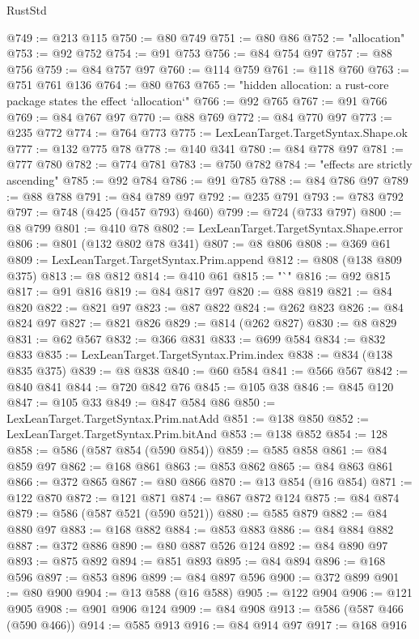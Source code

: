 \begin{lexlean}{RustStd}
\begin{coremodule}
{\begin{coremodule}
{{{{{{{{{{{{{{{{{{{{{{{{{{{{{{{{{{{{{{{{{{{{{{{{{{{{{@749 := @213 @115
@750 := @80 @749
@751 := @80 @86
@752 := "allocation"
@753 := @92 @752
@754 := @91 @753
@756 := @84 @754 @97
@757 := @88 @756
@759 := @84 @757 @97
@760 := @114 @759
@761 := @118 @760
@763 := @751 @761 @136
@764 := @80 @763
@765 := "hidden allocation: a rust-core package states the effect `allocation`"
@766 := @92 @765
@767 := @91 @766
@769 := @84 @767 @97
@770 := @88 @769
@772 := @84 @770 @97
@773 := @235 @772
@774 := @764 @773
@775 := LexLeanTarget.TargetSyntax.Shape.ok
@777 := @132 @775 @78
@778 := @140 @341
@780 := @84 @778 @97
@781 := @777 @780
@782 := @774 @781
@783 := @750 @782
@784 := "effects are strictly ascending"
@785 := @92 @784
@786 := @91 @785
@788 := @84 @786 @97
@789 := @88 @788
@791 := @84 @789 @97
@792 := @235 @791
@793 := @783 @792
@797 := @748 (@425 (@457 @793) @460)
@799 := @724 (@733 @797)
@800 := @8 @799
@801 := @410 @78
@802 := LexLeanTarget.TargetSyntax.Shape.error
@806 := @801 (@132 @802 @78 @341)
@807 := @8 @806
@808 := @369 @61
@809 := LexLeanTarget.TargetSyntax.Prim.append
@812 := @808 (@138 @809 @375)
@813 := @8 @812
@814 := @410 @61
@815 := "`"
@816 := @92 @815
@817 := @91 @816
@819 := @84 @817 @97
@820 := @88 @819
@821 := @84 @820
@822 := @821 @97
@823 := @87 @822
@824 := @262 @823
@826 := @84 @824 @97
@827 := @821 @826
@829 := @814 (@262 @827)
@830 := @8 @829
@831 := @62 @567
@832 := @366 @831
@833 := @699 @584
@834 := @832 @833
@835 := LexLeanTarget.TargetSyntax.Prim.index
@838 := @834 (@138 @835 @375)
@839 := @8 @838
@840 := @60 @584
@841 := @566 @567
@842 := @840 @841
@844 := @720 @842 @76
@845 := @105 @38
@846 := @845 @120
@847 := @105 @33
@849 := @847 @584 @86
@850 := LexLeanTarget.TargetSyntax.Prim.natAdd
@851 := @138 @850
@852 := LexLeanTarget.TargetSyntax.Prim.bitAnd
@853 := @138 @852
@854 := 128
@858 := @586 (@587 @854 (@590 @854))
@859 := @585 @858
@861 := @84 @859 @97
@862 := @168 @861
@863 := @853 @862
@865 := @84 @863 @861
@866 := @372 @865
@867 := @80 @866
@870 := @13 @854 (@16 @854)
@871 := @122 @870
@872 := @121 @871
@874 := @867 @872 @124
@875 := @84 @874
@879 := @586 (@587 @521 (@590 @521))
@880 := @585 @879
@882 := @84 @880 @97
@883 := @168 @882
@884 := @853 @883
@886 := @84 @884 @882
@887 := @372 @886
@890 := @80 @887 @526 @124
@892 := @84 @890 @97
@893 := @875 @892
@894 := @851 @893
@895 := @84 @894
@896 := @168 @596
@897 := @853 @896
@899 := @84 @897 @596
@900 := @372 @899
@901 := @80 @900
@904 := @13 @588 (@16 @588)
@905 := @122 @904
@906 := @121 @905
@908 := @901 @906 @124
@909 := @84 @908
@913 := @586 (@587 @466 (@590 @466))
@914 := @585 @913
@916 := @84 @914 @97
@917 := @168 @916
}}}}}}}}}}}}}}}}}}}}}}}}}}}}}}}}}}}}}}}}}}}}}}}}}}}}}
\end{coremodule}}
\end{coremodule}
\end{lexlean}
